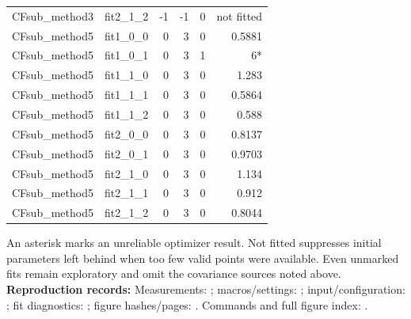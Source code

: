 \documentclass[11pt,a4paper]{article}
\begin{document}
{\begin{longtable}{llrrrr}
CFsub\_method3 & fit2\_1\_2 & -1 & -1 & 0 & not fitted\\
CFsub\_method5 & fit1\_0\_0 & 0 & 3 & 0 & 0.5881\\
CFsub\_method5 & fit1\_0\_1 & 0 & 3 & 1 & 6*\\
CFsub\_method5 & fit1\_1\_0 & 0 & 3 & 0 & 1.283\\
CFsub\_method5 & fit1\_1\_1 & 0 & 3 & 0 & 0.5864\\
CFsub\_method5 & fit1\_1\_2 & 0 & 3 & 0 & 0.588\\
CFsub\_method5 & fit2\_0\_0 & 0 & 3 & 0 & 0.8137\\
CFsub\_method5 & fit2\_0\_1 & 0 & 3 & 0 & 0.9703\\
CFsub\_method5 & fit2\_1\_0 & 0 & 3 & 0 & 1.134\\
CFsub\_method5 & fit2\_1\_1 & 0 & 3 & 0 & 0.912\\
CFsub\_method5 & fit2\_1\_2 & 0 & 3 & 0 & 0.8044\\
\hline\end{longtable}}
An asterisk marks an unreliable optimizer result. Not fitted suppresses initial parameters left behind when too few valid points were available. Even unmarked fits remain exploratory and omit the covariance sources noted above.
{\small\textbf{Reproduction records:} Measurements: ; macros/settings: ; input/configuration: ; fit diagnostics: ; figure hashes/pages: . Commands and full figure index: .}
\end{document}
